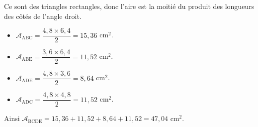 \begin{enumerate}
		 Ce sont des triangles rectangles, donc l'aire est la moitié du produit des longueurs des côtés de l'angle droit.
		\begin{itemize}[label =$\bullet$]
			\item $\mathcal{A}_{\text{ABC}}=\dfrac{4,8\times 6,4}{2}=15,36$ cm$^2$.
			\item $\mathcal{A}_{\text{ABE}}=\dfrac{3,6\times 6,4}{2}=11,52$ cm$^2$.
			\item $\mathcal{A}_{\text{ADE}}=\dfrac{4,8\times 3,6}{2}=8,64$ cm$^2$.
			\item $\mathcal{A}_{\text{ADC}}=\dfrac{4,8\times 4,8}{2}=11,52$ cm$^2$.
		\end{itemize}
		Ainsi $\mathcal{A}_{\text{BCDE}}=15,36+11,52+8,64+11,52=47,04$ cm$^2$.
\end{enumerate}
